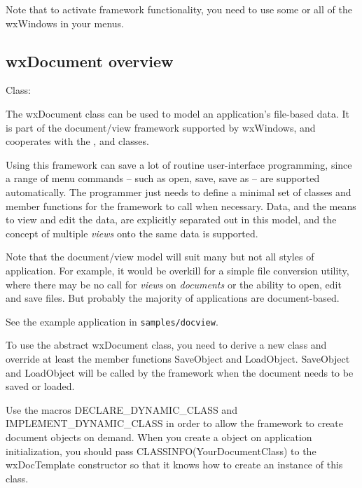 Note that to activate framework functionality, you need to use some or all of
the wxWindows  in your menus.

\subsection{wxDocument overview}\label{wxdocumentoverview}


Class: 

The wxDocument class can be used to model an application's file-based
data. It is part of the document/view framework supported by wxWindows,
and cooperates with the , \rtfsp
and  classes.

Using this framework can save a lot of routine user-interface programming,
since a range of menu commands -- such as open, save, save as -- are supported automatically.
The programmer just needs to define a minimal set of classes and member functions
for the framework to call when necessary. Data, and the means to view and edit
the data, are explicitly separated out in this model, and the concept of multiple {\it views} onto
the same data is supported.

Note that the document/view model will suit many but not all styles of application.
For example, it would be overkill for a simple file conversion utility, where there
may be no call for {\it views} on {\it documents} or the ability to open, edit and save
files. But probably the majority of applications are document-based.

See the example application in {\tt samples/docview}.

To use the abstract wxDocument class, you need to derive a new class and override
at least the member functions SaveObject and LoadObject. SaveObject and
LoadObject will be called by the framework when the document needs to be saved
or loaded.

Use the macros DECLARE\_DYNAMIC\_CLASS and IMPLEMENT\_DYNAMIC\_CLASS in order
to allow the framework to create document objects on demand. When you create
a  object on application initialization, you
should pass CLASSINFO(YourDocumentClass) to the wxDocTemplate constructor
so that it knows how to create an instance of this class.


